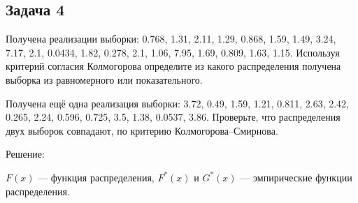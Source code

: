 \documentclass[a4paper,12pt]{article}
\newif\ifsolutions
\begin{document}
\subsection*{Задача 4}

Получена реализации выборки: 0.768, 1.31, 2.11, 1.29, 0.868, 1.59, 1.49, 3.24, 7.17, 2.1, 0.0434, 1.82, 0.278, 2.1, 1.06, 7.95, 1.69, 0.809, 1.63, 1.15.
Используя критерий согласия Колмогорова определите из какого распределения получена выборка из равномерного или показательного.

Получена ещё одна реализация выборки: 3.72, 0.49, 1.59, 1.21, 0.811, 2.63, 2.42, 0.265, 2.24, 0.596, 0.725, 3.5, 1.38, 0.0537, 3.86.
Проверьте, что распределения двух выборок совпадают, по критерию Колмогорова--Смирнова.

\ifsolutions Решение: \par
    $F(x)$ --- функция распределения, $F^*(x)$ и $G^*(x)$ --- эмпирические функции распределения.
\end{document}
